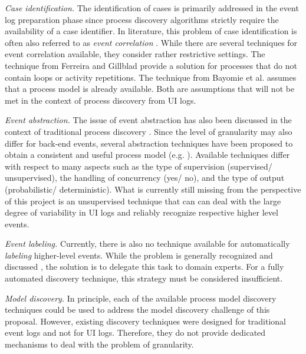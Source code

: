 \textit{Case identification.}  The identification of cases is primarily addressed in the event log preparation phase since process discovery algorithms strictly require the availability of a case identifier. In literature, this problem of case identification is often also referred to as \textit{event correlation} \cite{diba2020extraction}. While there are several techniques for event correlation available, they consider rather restrictive settings. The technique from Ferreira and Gillblad  \cite{ferreira2009discovering} provide a solution for processes that do not contain loops or activity repetitions. The technique from Bayomie et al. \cite{bayomie2019probabilistic} assumes that a process model is already available. Both are assumptions that will not be met in the context of process discovery from UI logs. 

\textit{Event abstraction.} The issue of event abstraction has also been discussed in the context of traditional process discovery \cite{van2020event,diba2020extraction}. Since the level of granularity may also differ for back-end events, several abstraction techniques have been proposed to obtain a consistent and useful process model (e.g. \cite{baier2014bridging,van2020event,de2020event}). Available techniques differ with respect to many aspects such as the type of supervision (supervised/ unsupervised), the handling of concurrency (yes/ no), and the type of output (probabilistic/ deterministic). What is currently still missing from the perspective of this project is an unsupervised technique that can can deal with the large degree of variability in UI logs and reliably recognize respective higher level events. 

\textit{Event labeling.} Currently, there is also no technique available for automatically \textit{labeling} higher-level events. While the problem is generally recognized and discussed \cite{van2020event,van2016enabling}, the  solution is to delegate this task to domain experts. For a fully automated discovery technique, this strategy must be considered insufficient.   

\textit{Model discovery.} In principle, each of the available process model discovery techniques could be used to address the model discovery challenge of this proposal. However, existing discovery techniques were designed for traditional event logs and not for UI logs. Therefore, they do not provide dedicated mechanisms to deal with the problem of granularity.  
 
 \noindent{}

